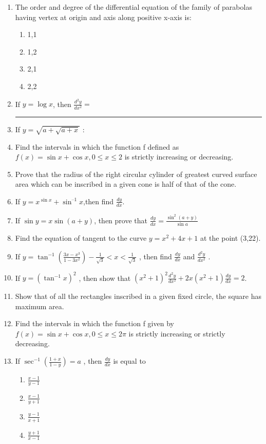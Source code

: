 \begin{enumerate}

\item The order and degree of the differential equation of the family of parabolas having vertex at origin and axis along positive x-axis is:


\begin{enumerate}
\item 1,1
\item 1,2
\item 2,1
\item 2,2
\end{enumerate}

\item If $y = \log x$, then $\frac{d^2y}{dx^2}=$ \rule{30pt}{1pt}

\item If $y=\sqrt{a+\sqrt{a+x}}$ :

\item Find the intervals in which the function f defined as $f(x) = \sin x + \cos x, 0\le x \le 2$ is strictly increasing or decreasing.

\item Prove that the radius of the right circular cylinder of greatest curved surface area which can be inscribed in a given cone is half of that of the cone.

\item If $y=x^{\sin x}+\sin^{–1}x$,then find $\frac{dy}{dx}$.

\item If $\sin y=x\sin(a+y)$, then prove that $\frac{dy}{dx}=\frac{\sin^2(a+y)}{\sin a}$ 


\item Find the equation of tangent to the curve $y=x^2+4x+1$ at the point (3,22).



\item If $y=\tan^{-1}(\frac{3x-x^3}{1-3x^2})-\frac{1}{\sqrt{3}}<x<\frac{1}{\sqrt{3}}$ , then find $\frac{dy}{dx}$ and $\frac{d^2y}{dx^2}$ .


    
\item If $y=(\tan^{-1} x)^2$ , then show that $(x^2+1)^2 \frac{d^2y}{dx^2}+2x(x^2+1) \frac{dy}{dx}=2$.

\item Show that of all the rectangles inscribed in a given fixed circle, the square has maximum area.
  

\item Find the intervals in which the function f given by $f(x)=\sin x+\cos x, 0 \le x \le 2\pi$ is strictly increasing or strictly decreasing.


\item If $\sec^{-1}(\frac{1+x}{1-y})=a$ , then $\frac{dy}{dx}$ is equal to
\begin{enumerate}
\item $\frac{x-1}{y-1}$
\item $\frac{x-1}{y+1}$
\item $\frac{y-1}{x+1}$
\item $\frac{y+1}{x-1}$
\end{enumerate}

\end{enumerate}

